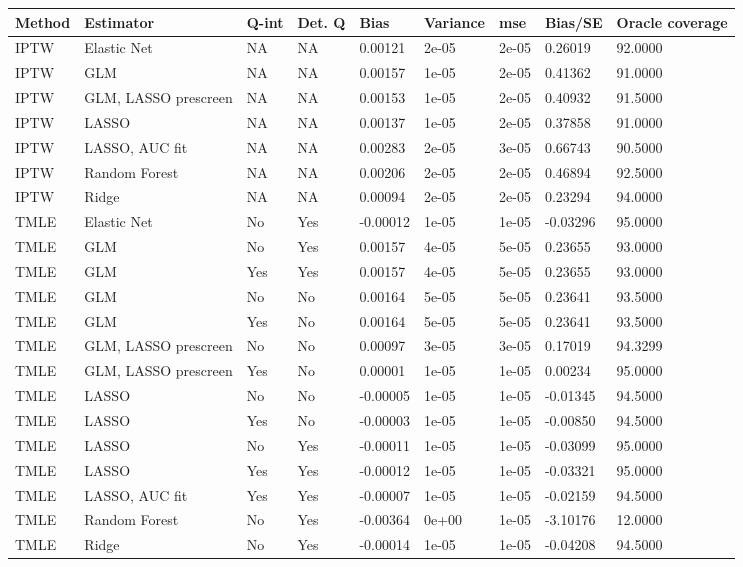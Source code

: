 
\begin{longtable}[l]{lllllllll}
\toprule
Method & Estimator & Q-int & Det. Q & Bias & Variance & mse & Bias/SE & Oracle coverage\\
\midrule
IPTW & Elastic Net & NA & NA & 0.00121 & 2e-05 & 2e-05 & 0.26019 & 92.0000\\
IPTW & GLM & NA & NA & 0.00157 & 1e-05 & 2e-05 & 0.41362 & 91.0000\\
IPTW & GLM, LASSO prescreen & NA & NA & 0.00153 & 1e-05 & 2e-05 & 0.40932 & 91.5000\\
IPTW & LASSO & NA & NA & 0.00137 & 1e-05 & 2e-05 & 0.37858 & 91.0000\\
IPTW & LASSO, AUC fit & NA & NA & 0.00283 & 2e-05 & 3e-05 & 0.66743 & 90.5000\\
IPTW & Random Forest & NA & NA & 0.00206 & 2e-05 & 2e-05 & 0.46894 & 92.5000\\
IPTW & Ridge & NA & NA & 0.00094 & 2e-05 & 2e-05 & 0.23294 & 94.0000\\
TMLE & Elastic Net & No & Yes & -0.00012 & 1e-05 & 1e-05 & -0.03296 & 95.0000\\
TMLE & GLM & No & Yes & 0.00157 & 4e-05 & 5e-05 & 0.23655 & 93.0000\\
TMLE & GLM & Yes & Yes & 0.00157 & 4e-05 & 5e-05 & 0.23655 & 93.0000\\
TMLE & GLM & No & No & 0.00164 & 5e-05 & 5e-05 & 0.23641 & 93.5000\\
TMLE & GLM & Yes & No & 0.00164 & 5e-05 & 5e-05 & 0.23641 & 93.5000\\
TMLE & GLM, LASSO prescreen & No & No & 0.00097 & 3e-05 & 3e-05 & 0.17019 & 94.3299\\
TMLE & GLM, LASSO prescreen & Yes & No & 0.00001 & 1e-05 & 1e-05 & 0.00234 & 95.0000\\
TMLE & LASSO & No & No & -0.00005 & 1e-05 & 1e-05 & -0.01345 & 94.5000\\
TMLE & LASSO & Yes & No & -0.00003 & 1e-05 & 1e-05 & -0.00850 & 94.5000\\
TMLE & LASSO & No & Yes & -0.00011 & 1e-05 & 1e-05 & -0.03099 & 95.0000\\
TMLE & LASSO & Yes & Yes & -0.00012 & 1e-05 & 1e-05 & -0.03321 & 95.0000\\
TMLE & LASSO, AUC fit & Yes & Yes & -0.00007 & 1e-05 & 1e-05 & -0.02159 & 94.5000\\
TMLE & Random Forest & No & Yes & -0.00364 & 0e+00 & 1e-05 & -3.10176 & 12.0000\\
TMLE & Ridge & No & Yes & -0.00014 & 1e-05 & 1e-05 & -0.04208 & 94.5000\\
\bottomrule
\end{longtable}
